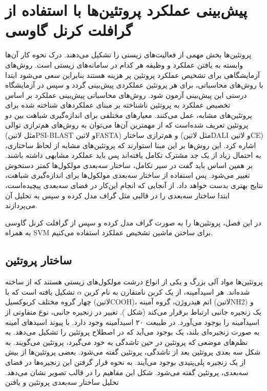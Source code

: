 \chapter{پیش‌بینی عملکرد پروتئین‌ها با استفاده از گرافلت کرنل گاوسی}
پروتئین‌ها بخش مهمی از فعالیت‌های زیستی را تشکیل می‌دهند. درک نحوه کار آن‌ها وابسته به یافتن عملکرد و وظیفه هر کدام در سامانه‌های زیستی است. روش‌های آزمایشگاهی برای تشخیص عملکرد پروتئین پر هزینه هستند بنابراین سعی می‌شود ابتدا با روش‌های محاسباتی، برای هر پروتئین عملکردی پیش‌بینی گردد و سپس در آزمایشگاه درستی این پیش‌بینی آزمون شود. روش‌های محاسباتی پیش‌بینی عملکرد بر اساس تخصیص عملکرد به پروتئین ناشناخته بر مبنای عملکردهای شناخته شده برای پروتئین‌های مشابه، عمل می‌کنند. معیارهای مختلفی برای اندازه‌گیری شباهت بین دو پروتئین تعریف شده‌است که از مهمترین آن‌ها می‌توان به روش‌های هم‌ترازی توالی (مثل ‌لاتین{PSI-BLAST} و ‌لاتین{FASTA}) و هم‌ترازی ساختار (مثل ‌لاتین{DALI} و ‌لاتین{CE}) اشاره کرد. این روش‌ها بر این مبنا استوارند که پروتئین‌های مشابه از لحاظ ساختاری، به احتمال زیاد از یک جد مشترک تکامل یافته‌اند پس باید عملکرد مشابهی داشته باشند. بر همین اساس باید گفت در سیر تکامل، ساختار سه‌بعدی مولکول‌ها کمتر دستخوش تغییر می‌شود. پس استفاده از ساختار سه‌بعدی مولکول‌ها برای اندازه‌گیری شباهت، نتایج بهتری بدست خواهد داد. از آنجایی که انجام این‌کار در فضای سه‌بعدی پیچیده‌است، ابتدا ساختار سه‌بعدی را در قالبی مثل گراف مدل کرده و سپس به تحلیل آن می‌پردازند.

در این فصل، پروتئین‌ها را به صورت گراف مدل کرده و سپس از گرافلت کرنل گاوسی به همراه SVM برای ساختن ماشین تشخیص عملکرد استفاده می‌کنیم.

\section{ساختار پروتئین}\label{sec:protein-structure}
پروتئین‌ها مواد آلی بزرگ و یکی از انواع درشت مولکول‌های زیستی هستند که از  ساخته شده‌اند. هر اسیدآمینه، از یک کربن نامتقارن به نام کربن $\alpha$ تشکیل یافته است که با چهار گروه مختلف کربوکسیل (‌لاتین{COOH})، اتم هیدروژن، گروه آمینه (‌لاتین{NH2}) و یک زنجیره جانبی ارتباط برقرار می‌کند (شکل ). تغییر در زنجیره جانبی، نوع متفاوتی از اسیدآمینه را بوجود می‌آورد. در طبیعت ۲۰ اسیدآمینه وجود دارد. با پیوند اسیدهای آمینه به صورت زنجیره‌‌ای بلند، یک  بوجود می‌آید که در اصطلاح  پروتئین را تشکیل می‌دهد. به نظم‌های موضعی که پروتئین در حین تاشدگی به خود می‌گیرد،  پروتئین می‌گویند. به شکل سه بعدی پروتئین بعد از تاشدگی،  پروتئین گفته می‌شود. بعضی پروتئین‌ها از بیش از یک زنجیره پلی‌پتیدی بوجود می‌آیند. به نحوه قرار گرفتن این زنجیره‌ها در فضای سه‌بعدی،  پروتئین گفته می‌شود. شکل  این مفاهیم را در قالب تصویر نشان می‌دهد. تحلیل ساختار سه‌بعدی پروتئین و یافتن 

